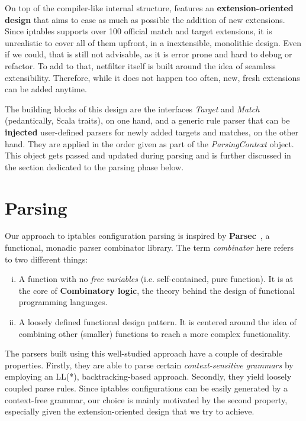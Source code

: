 On top of the compiler-like internal structure, \TOOL features an
\textbf{extension-oriented design} that aims to ease as much as possible the
addition of new extensions. Since iptables supports over 100 official match and
target extensions, it is unrealistic to cover all of them upfront, in a
inextensible, monolithic design.  Even if we could, that is still not
advisable, as it is error prone and hard to debug or refactor.  To add to that,
netfilter itself is built around the idea of seamless extensibility.
Therefore, while it does not happen too often, new, fresh extensions can be
added anytime.

The building blocks of this design are the interfaces \emph{Target} and
\emph{Match} (pedantically, Scala traits), on one hand, and a generic rule
parser that can be \textbf{injected} user-defined parsers for newly added
targets and matches, on the other hand.  They are applied in the order given as
part of the \emph{ParsingContext} object.  This object gets passed and updated
during parsing and is further discussed in the section dedicated to the parsing
phase below.


\section{Parsing}\label{sec:parsing}

Our approach to iptables configuration parsing is inspired by
\textbf{Parsec}~\cite{leijen2002parsec}, a functional, monadic parser
combinator library.  The term \emph{combinator} here refers to two different
things:
\begin{enumerate}[(i)]
  \item A function with no \emph{free variables} (i.e. self-contained, pure
    function).  It is at the core of \textbf{Combinatory logic}, the theory
    behind the design of functional programming languages.
  \item A loosely defined functional design pattern.  It is centered around the
    idea of combining other (smaller) functions to reach a more complex
    functionality.
\end{enumerate}

The parsers built using this well-studied approach have a couple of desirable
properties.  Firstly, they are able to parse certain \emph{context-sensitive
grammars} by employing an LL(*), backtracking-based approach.  Secondly, they
yield loosely coupled parse rules.  Since iptables configurations can be easily
generated by a context-free grammar, our choice is mainly motivated by the
second property, especially given the extension-oriented design that we try to
achieve.

